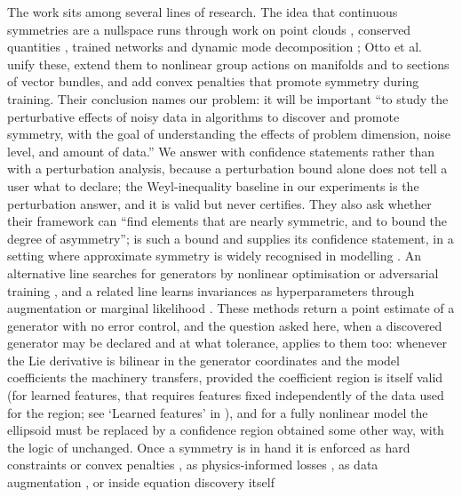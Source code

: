 The work sits among several lines of research. The idea that continuous
symmetries are a nullspace runs through work on point clouds
\citep{cahill2023liepca}, conserved quantities \citep{kaiser2018discovering},
trained networks \citep{moskalev2022liegg,gruver2023lie} and dynamic mode
decomposition \citep{baddoo2023physics}; Otto et al.~\citep{otto2025unified} unify these,
extend them to nonlinear group actions on manifolds and to sections of vector
bundles, and add convex penalties that promote symmetry during training. Their
conclusion names our problem: it will be important ``to study the perturbative
effects of noisy data in algorithms to discover and promote symmetry, with the
goal of understanding the effects of problem dimension, noise level, and
amount of data.'' We answer with confidence statements rather than with a
perturbation analysis, because a perturbation bound alone does not tell a user
what to declare; the Weyl-inequality baseline in our experiments is the
perturbation answer, and it is valid but never certifies. They also ask whether
their framework can ``find elements that are nearly symmetric, and to bound the
degree of asymmetry'';  is such a bound and \symcert{}
supplies its confidence statement, in a setting where approximate symmetry is
widely recognised in modelling \citep{wang2022approximately,romero2022learning}.
An alternative line searches for generators by nonlinear optimisation or
adversarial training \citep{desai2022symmetry,yang2023liegan,yang2024latent,
dehmamy2021automatic,liu2022machine}, and a related line learns
invariances as hyperparameters through augmentation or marginal likelihood
\citep{benton2020learning,immer2022invariance}. These
methods return a point estimate of a generator with no error control, and the
question asked here, when a discovered generator may be declared and at what
tolerance, applies to them too: whenever the Lie derivative is bilinear in the
generator coordinates and the model coefficients the machinery transfers,
provided the coefficient region is itself valid (for learned features, that
requires features fixed independently of the data used for the region; see
`Learned features' in ), and
for a fully nonlinear model the ellipsoid must be replaced by a confidence
region obtained some other way, with the logic of 
unchanged. Once a symmetry is in hand it is enforced as hard constraints or
convex penalties \citep{otto2025unified}, as physics-informed losses
\citep{raissi2019physics,akhound2023lie}, as data augmentation
\citep{brandstetter2022lie}, or inside equation discovery itself
